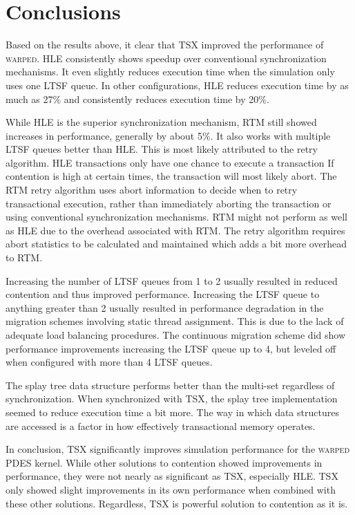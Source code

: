 \documentclass[11pt]{book}
\begin{document}
\section{Conclusions}

Based on the results above, it clear that TSX improved the performance of \textsc{warped}.
HLE consistently shows speedup over conventional synchronization mechanisms.  It even
slightly reduces execution time when the simulation only uses one LTSF queue.  In other
configurations, HLE reduces execution time by as much as 27\% and consistently
reduces execution time by 20\%.   

While HLE is the superior synchronization mechanism, RTM still showed increases
in performance, generally by about 5\%.  It also works with multiple
LTSF queues better than HLE.  This is most likely attributed to the retry
algorithm.  HLE transactions only have one chance to execute a transaction  If
contention is high at certain times, the transaction will most likely abort.
The RTM retry algorithm uses abort information to decide when to retry
transactional execution, rather than immediately aborting the transaction or
using conventional synchronization mechanisms.  RTM might not perform as well as
HLE due to the overhead associated with RTM.  The retry algorithm requires abort
statistics to be calculated and maintained which adds a bit more overhead to
RTM.  

Increasing the number of LTSF queues from 1 to 2 usually resulted in reduced contention
and thus improved performance.  Increasing the LTSF queue to anything greater than 2
usually resulted in performance degradation in the migration schemes involving static
thread assignment.  This is due to the lack of adequate load balancing procedures.  The
continuous migration scheme did show performance improvements increasing the LTSF queue up
to 4, but leveled off when configured with more than 4 LTSF queues.

The splay tree data structure performs better than the multi-set regardless of
synchronization.  When synchronized with TSX, the splay tree implementation
seemed to reduce execution time a bit more.  The way in which data structures
are accessed is a factor in how effectively transactional memory operates. 

In conclusion, TSX significantly improves simulation performance for the \textsc{warped}
PDES kernel.  While other solutions to contention showed improvements in
performance, they were not nearly as significant as TSX, especially HLE.  TSX only
showed slight improvements in its own performance when combined with these other
solutions.  Regardless, TSX is powerful solution to contention as it is. 
\end{document}
